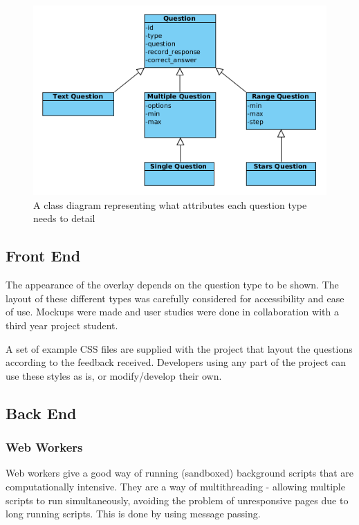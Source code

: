\begin{figure}
\centering
\includegraphics[width=12cm]{../figures/questions_class_diagram.png}
\caption{A class diagram representing what attributes each question type needs to detail}
\label{Figure:questions_class_diagram}
\end{figure}

\subsection{Front End}

The appearance of the overlay depends on the question type to be shown. The layout of these different types was carefully considered for accessibility and ease of use. Mockups were made and user studies were done in collaboration with a third year project student.

A set of example \gls{CSS} files are supplied with the project that layout the questions according to the feedback received. Developers using any part of the project can use these styles as is, or modify/develop their own.

\subsection{Back End}

\subsubsection{Web Workers}

Web workers give a good way of running (sandboxed) background scripts that are computationally intensive. They are a way of multithreading - allowing multiple scripts to run simultaneously, avoiding the problem of unresponsive pages due to long running scripts. This is done by using message passing.

